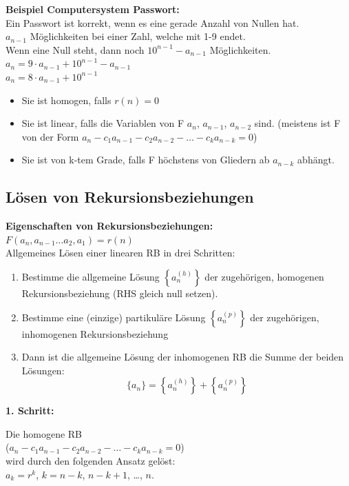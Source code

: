 \documentclass[12pt]{scrartcl}
\begin{document}
\textbf{Beispiel Computersystem Passwort:}\\
Ein Passwort ist korrekt, wenn es eine gerade Anzahl von Nullen hat.\\

$a_{n-1}$ Möglichkeiten bei einer Zahl, welche mit 1-9 endet.\\
Wenn eine Null steht, dann noch $10^{n-1} - a_{n-1}$ Möglichkeiten.\\

$a_n = 9 \cdot a_{n-1} + 10^{n-1} - a_{n-1}$\\
$a_n = 8 \cdot a_{n-1} + 10^{n-1}$\\

\begin{itemize}
    \item Sie ist homogen, falls $r(n) = 0$
    \item Sie ist linear, falls die Variablen von F $a_n$, $a_{n-1}$, $a_{n-2}$ sind.
    (meistens ist F von der Form $a_n - c_1a_{n-1} - c_2a_{n-2} - \dots - c_ka_{n-k} = 0$)
    \item Sie ist von k-tem Grade, falls F höchstens von Gliedern ab $a_{n-k}$ abhängt.
\end{itemize}

\newpage
\subsection{Lösen von Rekursionsbeziehungen}
\textbf{Eigenschaften von Rekursionsbeziehungen:}\\
$F(a_n, a_{n-1} \dots a_2, a_1) = r(n)$\\

Allgemeines Lösen einer linearen RB in drei Schritten:
\begin{enumerate}
    \item Bestimme die allgemeine Lösung $\displaystyle{\left\{a_n^{(h)}\right\}}$ der zugehörigen, homogenen
    Rekursionsbeziehung (RHS gleich null setzen).
    \item Bestimme eine (einzige) partikuläre Lösung $\displaystyle{\left\{a_n^{(p)}\right\}}$ der zugehörigen, inhomogenen Rekursionsbeziehung
    \item Dann ist die allgemeine Lösung der inhomogenen RB die Summe der beiden Lösungen:
    \[\{a_n\} = \left\{a_n^{(h)}\right\} + \left\{a_n^{(p)}\right\}\]
\end{enumerate}

\textbf{1. Schritt:}

Die homogene RB\\
($a_n - c_1a_{n-1} - c_2a_{n-2} - \dots - c_ka_{n-k} = 0$)\\
wird durch den folgenden Ansatz gelöst:\\
$a_k = r^k$, $k = n-k$, $n-k + 1$, \dots, $n$.\\
\end{document}
